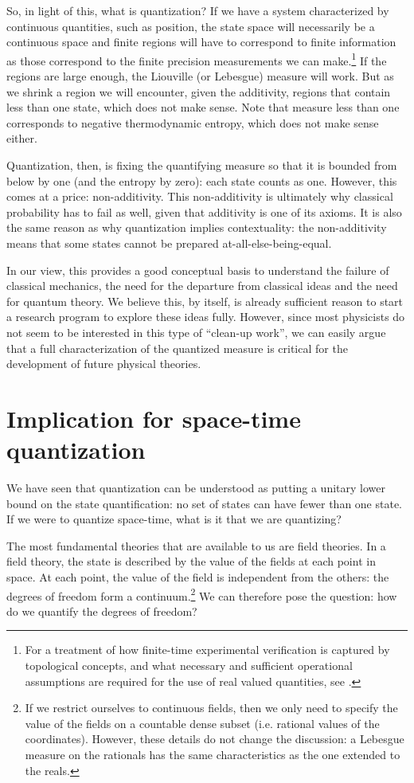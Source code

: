 \documentclass[10pt,twocolumn, nofootinbib]{revtex4-2}
\begin{document}
So, in light of this, what is quantization? If we have a system characterized by continuous quantities, such as position, the state space will necessarily be a continuous space and finite regions will have to correspond to finite information as those correspond to the finite precision measurements we can make.\footnote{For a treatment of how finite-time experimental verification is captured by topological concepts, and what necessary and sufficient operational assumptions are required for the use of real valued quantities, see \cite{kelly1996,aop-book}.} If the regions are large enough, the Liouville (or Lebesgue) measure will work. But as we shrink a region we will encounter, given the additivity, regions that contain less than one state, which does not make sense. Note that measure less than one corresponds to negative thermodynamic entropy, which does not make sense either.

Quantization, then, is fixing the quantifying measure so that it is bounded from below by one (and the entropy by zero): each state counts as one. However, this comes at a price: non-additivity. This non-additivity is ultimately why classical probability has to fail as well, given that additivity is one of its axioms. It is also the same reason as why quantization implies contextuality: the non-additivity means that some states cannot be prepared at-all-else-being-equal.

In our view, this provides a good conceptual basis to understand the failure of classical mechanics, the need for the departure from classical ideas and the need for quantum theory. We believe this, by itself, is already sufficient reason to start a research program to explore these ideas fully. However, since most physicists do not seem to be interested in this type of ``clean-up work'', we can easily argue that a full characterization of the quantized measure is critical for the development of future physical theories.

\section{Implication for space-time quantization}

We have seen that quantization can be understood as putting a unitary lower bound on the state quantification: no set of states can have fewer than one state. If we were to quantize space-time, what is it that we are quantizing?

The most fundamental theories that are available to us are field theories. In a field theory, the state is described by the value of the fields at each point in space. At each point, the value of the field is independent from the others: the degrees of freedom form a continuum.\footnote{If we restrict ourselves to continuous fields, then we only need to specify the value of the fields on a countable dense subset (i.e. rational values of the coordinates). However, these details do not change the discussion: a Lebesgue measure on the rationals has the same characteristics as the one extended to the reals.} We can therefore pose the question: how do we quantify the degrees of freedom?
\end{document}
